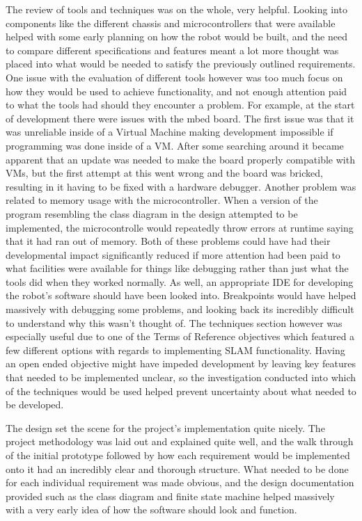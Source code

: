 	The review of tools and techniques was on the whole, very helpful. Looking into components like the different chassis and microcontrollers that were available helped with some early planning on how the robot would be built, and the need to compare different specifications and features meant a lot more thought was placed into what would be needed to satisfy the previously outlined requirements. One issue with the evaluation of different tools however was too much focus on how they would be used to achieve functionality, and not enough attention paid to what the tools had should they encounter a problem. For example, at the start of development there were issues with the mbed board. The first issue was that it was unreliable inside of a Virtual Machine making development impossible if programming was done inside of a VM. After some searching around it became apparent that an update was needed to make the board properly compatible with VMs, but the first attempt at this went wrong and the board was bricked, resulting in it having to be fixed with a hardware debugger. Another problem was related to memory usage with the microcontroller. When a version of the program resembling the class diagram in the design attempted to be implemented, the microcontrolle would repeatedly throw errors at runtime saying that it had ran out of memory. Both of these problems could have had their developmental impact significantly reduced if more attention had been paid to what facilities were available for things like debugging rather than just what the tools did when they worked normally. As well, an appropriate IDE for developing the robot's software should have been looked into. Breakpoints would have helped massively with debugging some problems, and looking back its incredibly difficult to understand why this wasn't thought of. The techniques section however was especially useful due to one of the Terms of Reference objectives which featured a few different options with regards to implementing SLAM functionality. Having an open ended objective might have impeded development by leaving key features that needed to be implemented unclear, so the investigation conducted into which of the techniques would be used helped prevent uncertainty about what needed to be developed.
	
	The design set the scene for the project's implementation quite nicely. The project methodology was laid out and explained quite well, and the walk through of the initial prototype followed by how each requirement would be implemented onto it had an incredibly clear and thorough structure. What needed to be done for each individual requirement was made obvious, and the design documentation provided such as the class diagram and finite state machine helped massively with a very early idea of how the software should look and function. 
	
